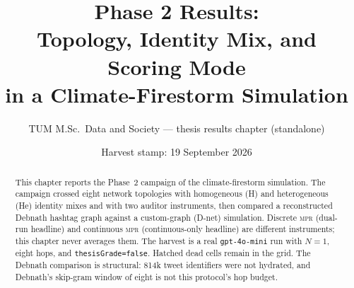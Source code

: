 \documentclass[
  11pt,
  a4paper,
  oneside,
  bibliography=totoc,
  listof=totoc,
  captions=tableheading,
  headings=normal,
  numbers=noenddot
]{scrartcl}
\title{Phase 2 Results:\\
Topology, Identity Mix, and Scoring Mode\\
in a Climate-Firestorm Simulation}
\author{TUM M.Sc.\ Data and Society --- thesis results chapter (standalone)}
\date{Harvest stamp: 19 September 2026}
\newcommand{\MPR}{\textsc{mpr}}
\begin{document}
\maketitle

\begin{abstract}
This chapter reports the Phase~2 campaign of the climate-firestorm simulation.
The campaign crossed eight network topologies with homogeneous (H) and heterogeneous (He) identity mixes and with two auditor instruments, then compared a reconstructed Debnath hashtag graph against a custom-graph (D-net) simulation.
Discrete \MPR{} (dual-run headline) and continuous \MPR{} (continuous-only headline) are different instruments; this chapter never averages them.
The harvest is a real \texttt{gpt-4o-mini} run with $N=1$, eight hops, and \texttt{thesisGrade=false}.
Hatched dead cells remain in the grid.
The Debnath comparison is structural: 814k tweet identifiers were not hydrated, and Debnath's skip-gram window of eight is not this protocol's hop budget.
\end{abstract}

\tableofcontents
\listoffigures
\listoftables
\clearpage












\printbibliography[title={References}]
\end{document}
